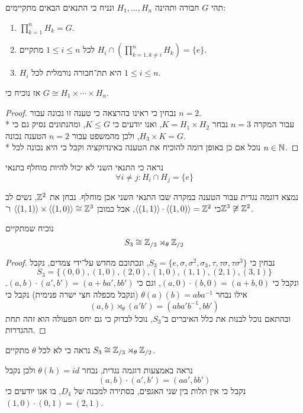 \Question{}
\Subquestion{}
תהי $G$ חבורה ותהינה $H_1, \dots, H_n$ ונניח כי התנאים הבאים מתקיימים:
\begin{enumerate}
	\item $\prod_{k = 1}^n H_k = G$.
	\item לכל $1 \le i \le n$ מתקיים $H_i \cap (\prod_{k = 1, k \ne i}^n H_k) = \{e\}$.
	\item $H_i$ היא תת־חבורה נורמלית לכל $1 \le i \le n$.
\end{enumerate}
אז נוכיח כי $G \cong H_1 \times \cdots \times H_n$.
\begin{proof}
	נבחין כי ראינו בהרצאה כי טענה זו נכונה עבור $n = 2$. \\*
	עבור המקרה $n = 3$ נבחר $K = H_1 \times H_2$, ואנו יודעים כי $K \le G$, ומהנתונים נסיק גם כי $H_3 \times K = G$, ולכן מהמשפט עבור $n = 2$ הטענה נכונה. \\*
	נוכל אם כן באופן דומה להוכיח את הטענה באינדוקציה וקבל כי היא נכונה לכל $n \in \mathbb{N}$.
\end{proof}

\Subquestion{}
נראה כי התנאי השני לא יכול להיות מוחלף בתנאי
\[
	\forall i \ne j : H_i \cap H_j = \{ e \}
\]

נמצא דוגמה נגדית עבור הטענה במקרה שבו התנאי השני אכן מוחלף.
נבחן את $\mathbb{Z}^2$, נשים לב כי $\langle (1, 1) \rangle \cdot \langle (1, 0) \rangle = \mathbb{Z}^2$, אבל כמובן $\langle (1, 1) \rangle \times \langle (1, 0) \rangle \cong \mathbb{Z}^3$ ו־$\mathbb{Z}^3 \not\cong \mathbb{Z}^2$.

\Question{}
\Subquestion{}
נוכיח שמתקיים
\[
	S_3 \cong \mathbb{Z}_{/3} \rtimes_\theta \mathbb{Z}_{/2}
\]
\begin{proof}
	נבחין כי $S_3 = \{ e, \sigma, \sigma^2, \sigma_3, \tau, \tau \sigma, \tau \sigma^3 \}$, ונכתובם מחדש על־ידי צמדים, נקבל
	\[
		S_3 = \{ (0, 0), (1, 0), (2, 0), (1, 0), (1, 1), (2, 1), (3, 1) \}
	\]
	ונקבל כי $(a, 0) \cdot (b, 0) = (a + b, 0)$, וגם כי $(a, b) \cdot (a', b') = (a + b a', b b')$.
	אילו נבחר $\theta(a)(b) = a b a^{-1}$ (ונקבל מכפלה חצי ישרה פנימית) נקבל כי
	\[
		(a, b) \rtimes_\theta (a' b') = (a b a' b^{-1}, b b')
	\]
	ובהתאם נוכל לבנות את כלל האיברים ב־$S_3$, נוכל לבדוק כי גם יחס הפעולה הוא זהה תחת ההגדרות.
\end{proof}

\Subquestion{}
נראה כי לא לכל $\theta$ מתקיים $S_3 \cong \mathbb{Z}_{/3} \rtimes_\theta \mathbb{Z}_{/2}$.

נראה באמצעות דוגמה נגדית, נבחר $\theta(h) = id$ ולכן נקבל
\[
	(a, b) \cdot (a', b') = (a a', b b')
\]
נקבל כי אין תלות בין שני האגפים, בסתירה למבנה של $D_4$, בו אנו יודעים כי $(1, 0) \cdot (0, 1) = (2, 1)$.

